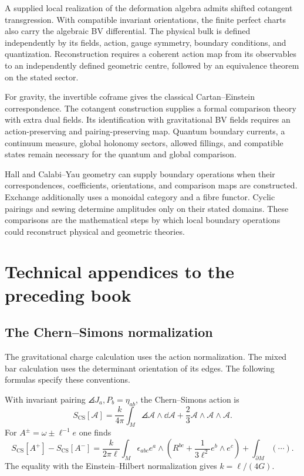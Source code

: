 A supplied local realization of the deformation algebra admits shifted cotangent transgression. With compatible invariant orientations, the finite perfect charts also carry the algebraic BV differential. The physical bulk is defined independently by its fields, action, gauge symmetry, boundary conditions, and quantization. Reconstruction requires a coherent action map from its observables to an independently defined geometric centre, followed by an equivalence theorem on the stated sector.

For gravity, the invertible coframe gives the classical Cartan--Einstein correspondence. The cotangent construction supplies a formal comparison theory with extra dual fields. Its identification with gravitational BV fields requires an action-preserving and pairing-preserving map. Quantum boundary currents, a continuum measure, global holonomy sectors, allowed fillings, and compatible states remain necessary for the quantum and global comparison.

Hall and Calabi--Yau geometry can supply boundary operations when their correspondences, coefficients, orientations, and comparison maps are constructed. Exchange additionally uses a monoidal category and a fibre functor. Cyclic pairings and sewing determine amplitudes only on their stated domains. These comparisons are the mathematical steps by which local boundary operations could reconstruct physical and geometric theories.

\part{Technical appendices to the preceding book}

\chapter{The Chern--Simons normalization}
The gravitational charge calculation uses the action normalization. The mixed bar calculation uses the determinant orientation of its edges. The following formulas specify these conventions.

With invariant pairing $\angles{J_a,P_b}=\eta_{ab}$, the Chern--Simons action is
\[
 S_{\mathrm{CS}}[\mathcal A]
 =\frac{k}{4\pi}\int_M
 \angles{\mathcal A\wedge\dd\mathcal A
 +\frac23\mathcal A\wedge\mathcal A\wedge\mathcal A}.
\]
For $A^\pm=\omega\pm\ell^{-1}e$ one finds
\[
 S_{\mathrm{CS}}[A^+]-S_{\mathrm{CS}}[A^-]
 =\frac{k}{2\pi\ell}\int_M
 \epsilon_{abc}e^a\wedge
 \left(R^{bc}+\frac1{3\ell^2}e^b\wedge e^c\right)
 +\int_{\partial M}(\cdots).
\]
The equality with the Einstein--Hilbert normalization gives $k=\ell/(4G)$.

